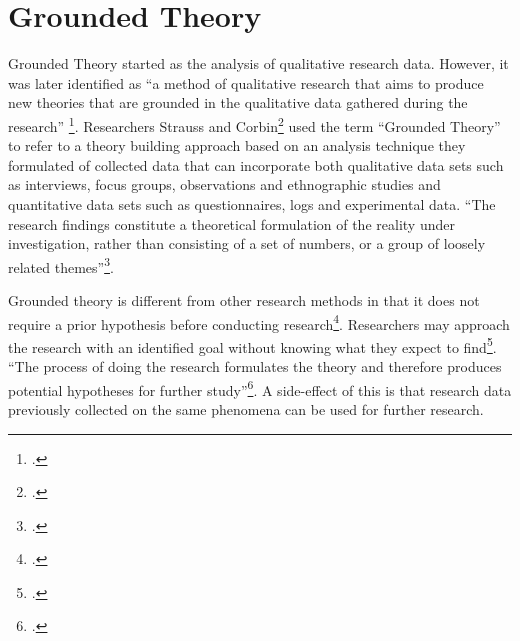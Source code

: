 \section{Grounded Theory} 

Grounded Theory started as the analysis of qualitative research data. However, it was later identified as ``a method of qualitative research that aims to produce new theories that are grounded in the qualitative data gathered during the research'' \footcite{Glaser1967}.
Researchers Strauss and Corbin\footcite{Strauss1990} used the term ``Grounded Theory'' to refer to a theory building approach based on an analysis technique they formulated of collected data that can incorporate both qualitative data sets such as interviews, focus groups, observations and ethnographic studies and quantitative data sets such as questionnaires, logs and experimental data. ``The research findings constitute a theoretical formulation of the reality under investigation, rather than consisting of a set of numbers, or a group of loosely related themes''\footcite {Strauss1990}.

Grounded theory is different from other research methods in that it does not require a prior hypothesis before conducting research\footcite{Glaser1967}. Researchers may approach the research with an identified goal without knowing what they expect to find\footcite{Adams1997}. ``The process of doing the research formulates the theory and therefore produces potential hypotheses for further study''\footcite{Adams1997}. A side-effect of this is that research data previously collected on the same phenomena can be used for further research.

